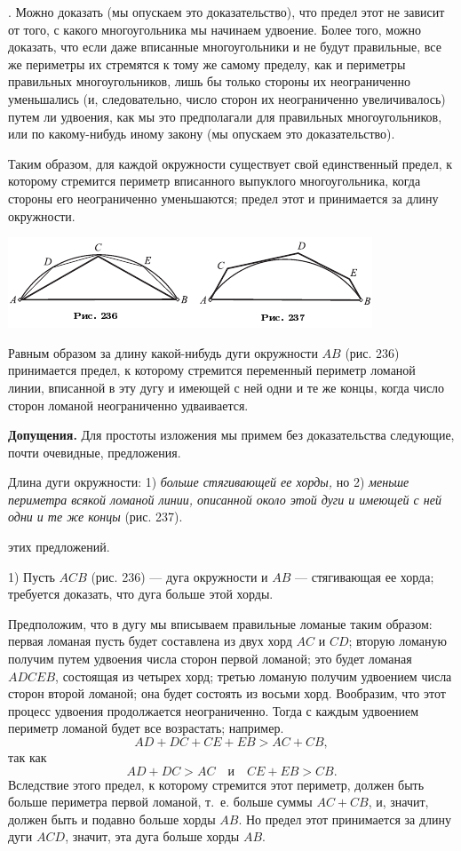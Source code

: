 \documentclass[oneside]{book}
\begin{document}
.
Можно доказать (мы опускаем это доказательство), что предел этот не зависит от того, с какого многоугольника мы начинаем удвоение.
Более того, можно доказать, что если даже вписанные многоугольники и не будут правильные, все же периметры их стремятся к тому же самому пределу, как и периметры правильных многоугольников, лишь бы только стороны их неограниченно уменьшались (и, следовательно, число сторон их неограниченно увеличивалось) путем ли удвоения, как мы это предполагали для правильных многоугольников, или по какому-нибудь иному закону (мы опускаем это доказательство).

Таким образом, для каждой окружности существует свой единственный предел, к которому стремится периметр вписанного выпуклого многоугольника, когда стороны его неограниченно уменьшаются;
предел этот и принимается за длину окружности.

\includegraphics{pics/ris-236-237}

Равным образом за длину какой-нибудь дуги окружности $AB$ (рис. 236) принимается предел, к которому стремится переменный периметр ломаной линии, вписанной в эту дугу и имеющей с ней одни и те же концы, когда число сторон ломаной неограниченно удваивается. %

\textbf{Допущения.}
Для простоты изложения мы примем без доказательства следующие, почти очевидные, предложения.

Длина дуги окружности:
1) \emph{больше стягивающей ее хорды,} но 2) \emph{меньше периметра всякой ломаной линии, описанной около этой дуги и имеющей с ней одни и те же концы} (рис. 237).

 этих предложений.

1) Пусть $ACB$ (рис. 236) — дуга окружности и $AB$ — стягивающая ее хорда;
требуется доказать, что дуга больше этой хорды.

Предположим, что в дугу мы вписываем правильные ломаные таким образом:
первая ломаная пусть будет составлена из двух хорд $AC$ и $CD$;
вторую ломаную получим путем удвоения числа сторон первой ломаной;
это будет ломаная $ADCEB$, состоящая из четырех хорд;
третью ломаную получим удвоением числа сторон второй ломаной;
она будет состоять из восьми хорд.
Вообразим, что этот процесс удвоения продолжается неограниченно.
Тогда с каждым удвоением периметр ломаной будет все возрастать;
например.
\[AD+DC+CE+EB>AC+CB,\]
так как
\[AD+DC>AC\quad\text{и}\quad CE+EB>CB.\]
Вследствие этого предел, к которому стремится этот периметр, должен быть больше периметра первой ломаной, т.~е. больше суммы $AC+CB$, и, значит, должен быть и подавно больше хорды $AB$.
Но предел этот принимается за длину дуги $ACD$, значит, эта дуга больше хорды $AB$.
\end{document}
